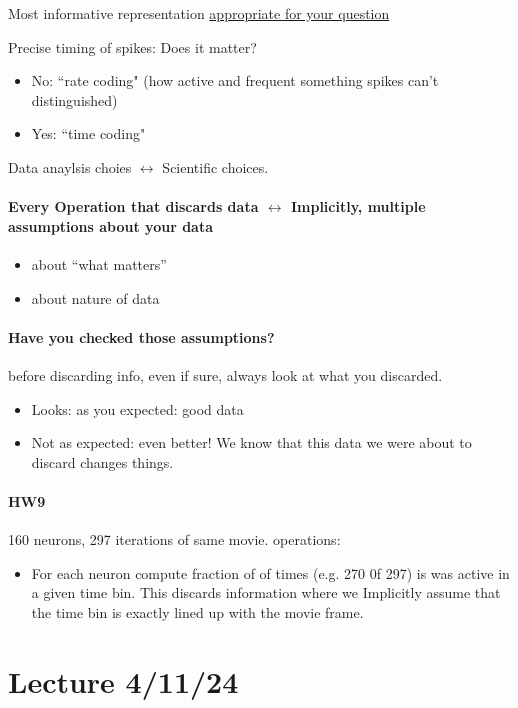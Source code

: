\documentclass[../main.tex]{subfiles}
\begin{document}
Most informative representation \underline{appropriate for your question} 

Precise timing of spikes: Does it matter?
\begin{itemize}
    \item No: ``rate coding" (how active and frequent something spikes can't distinguished) 
    \item Yes: ``time coding" 
\end{itemize}
Data anaylsis choies $\leftrightarrow$ Scientific choices.

\paragraph*{Every Operation that discards data $\leftrightarrow$ Implicitly, multiple assumptions
about your data}
\begin{itemize}
    \item about ``what matters'' 
    \item about nature of data
\end{itemize}
\paragraph*{Have you checked those assumptions?}
before discarding info, even if sure, always look at what you discarded.
\begin{itemize}
    \item Looks: as you expected: good data
    \item Not as expected: even better! We know that this data we were about to discard changes things.
\end{itemize}

\paragraph*{HW9}
160 neurons, 297 iterations of same movie. operations:
\begin{itemize}
    \item For each neuron compute fraction of of times (e.g. 270 0f 297) is was active in a given 
    time bin. This discards information where we Implicitly assume that the time bin is exactly
    lined up with the movie frame.
\end{itemize}

\newpage
\section*{Lecture 4/11/24}
\end{document}
